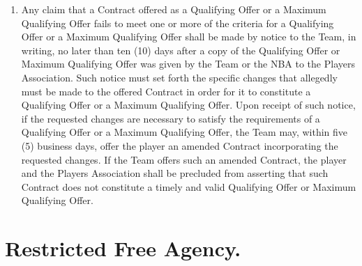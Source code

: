 \documentclass[
]{book}
\begin{document}
\begin{enumerate}
\begin{enumerate}
  \end{enumerate}
\item
  Any claim that a Contract offered as a Qualifying Offer or a Maximum Qualifying Offer fails to meet one or more of the criteria for a Qualifying Offer or a Maximum Qualifying Offer shall be made by notice to the Team, in writing, no later than ten (10) days after a copy of the Qualifying Offer or Maximum Qualifying Offer was given by the Team or the NBA to the Players Association. Such notice must set forth the specific changes that allegedly must be made to the offered Contract in order for it to constitute a Qualifying Offer or a Maximum Qualifying Offer. Upon receipt of such notice, if the requested changes are necessary to satisfy the requirements of a Qualifying Offer or a Maximum Qualifying Offer, the Team may, within five (5) business days, offer the player an amended Contract incorporating the requested changes. If the Team offers such an amended Contract, the player and the Players Association shall be precluded from asserting that such Contract does not constitute a timely and valid Qualifying Offer or Maximum Qualifying Offer.
\end{enumerate}

\hypertarget{restricted-free-agency.}{%
\section{Restricted Free Agency.}\label{restricted-free-agency.}}
\end{document}
